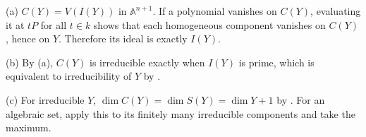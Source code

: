 (a) $C(Y)=V(I(Y))$ in $\mathbb A^{n+1}$. If a polynomial vanishes on $C(Y)$, evaluating it at $tP$ for all $t\in k$ shows that each homogeneous component vanishes on $C(Y)$, hence on $Y$. Therefore its ideal is exactly $I(Y)$.

(b) By (a), $C(Y)$ is irreducible exactly when $I(Y)$ is prime, which is equivalent to irreducibility of $Y$ by .

(c) For irreducible $Y$, $\dim C(Y)=\dim S(Y)=\dim Y+1$ by . For an algebraic set, apply this to its finitely many irreducible components and take the maximum.
